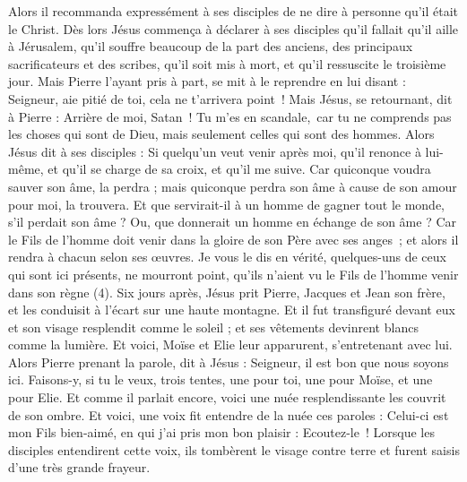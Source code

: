 \begin{multicols}{2}
{Alors il recommanda expressément à ses disciples de ne dire à personne qu’il était le Christ.
Dès lors Jésus commença à déclarer à ses disciples qu'il fallait qu'il aille à Jérusalem, qu'il souffre beaucoup de la part des anciens, des principaux sacrificateurs et des scribes, qu'il soit mis à mort, et qu'il ressuscite le troisième jour.
Mais Pierre l'ayant pris à part, se mit à le reprendre en lui disant : Seigneur, aie pitié de toi, cela ne t'arrivera point !
Mais Jésus, se retournant, dit à Pierre : Arrière de moi, Satan ! Tu m'es en scandale, car tu ne comprends pas les choses qui sont de Dieu, mais seulement celles qui sont des hommes.
Alors Jésus dit à ses disciples : Si quelqu'un veut venir après moi, qu'il renonce à lui-même, et qu'il se charge de sa croix, et qu’il me suive.
Car quiconque voudra sauver son âme, la perdra ; mais quiconque perdra son âme à cause de son amour pour moi, la trouvera.
Et que servirait-il à un homme de gagner tout le monde, s'il perdait son âme ? Ou, que donnerait un homme en échange de son âme ?
Car le Fils de l'homme doit venir dans la gloire de son Père avec ses anges ; et alors il rendra à chacun selon ses œuvres.
Je vous le dis en vérité, quelques-uns de ceux qui sont ici présents, ne mourront point, qu’ils n’aient vu le Fils de l'homme venir dans son règne (4).
\VerseOne{}Six jours après, Jésus prit Pierre, Jacques et Jean son frère, et les conduisit à l'écart sur une haute montagne.
Et il fut transfiguré devant eux et son visage resplendit comme le soleil ; et ses vêtements devinrent blancs comme la lumière.
Et voici, Moïse et Elie leur apparurent, s'entretenant avec lui.
Alors Pierre prenant la parole, dit à Jésus : Seigneur, il est bon que nous soyons ici. Faisons-y, si tu le veux, trois tentes, une pour toi, une pour Moïse, et une pour Elie.
Et comme il parlait encore, voici une nuée resplendissante les couvrit de son ombre. Et voici, une voix fit entendre de la nuée ces paroles : Celui-ci est mon Fils bien-aimé, en qui j'ai pris mon bon plaisir : Ecoutez-le !
Lorsque les disciples entendirent cette voix, ils tombèrent le visage contre terre et furent saisis d’une très grande frayeur.
}
\end{multicols}
